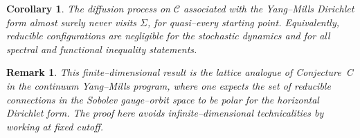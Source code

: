 \documentclass[11pt]{article}
\newtheorem{corollary}[theorem]{Corollary}
\newtheorem{remark}[theorem]{Remark}
\begin{document}
\begin{corollary}
The diffusion process on $\mathcal{C}$ associated with the Yang--Mills
Dirichlet form almost surely never visits $\Sigma$, for quasi--every
starting point. Equivalently, reducible configurations are negligible
for the stochastic dynamics and for all spectral and functional
inequality statements.
\end{corollary}

\begin{remark}
This finite--dimensional result is the lattice analogue of Conjecture~C
in the continuum Yang--Mills program, where one expects the set of
reducible connections in the Sobolev gauge--orbit space to be polar for
the horizontal Dirichlet form. The proof here avoids infinite--dimensional
technicalities by working at fixed cutoff.
\end{remark}
\end{document}
